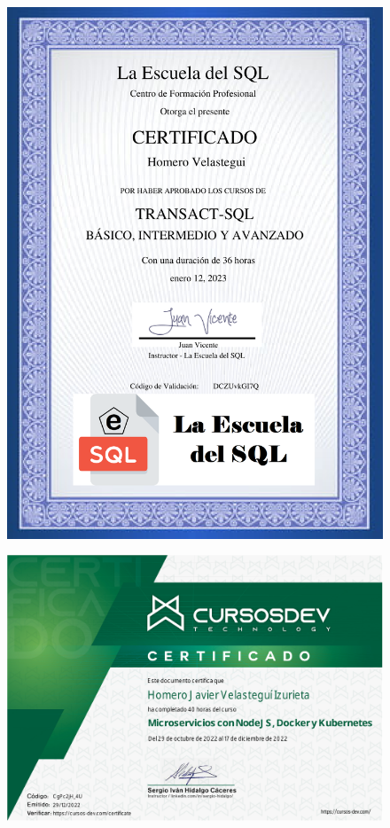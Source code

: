 \begin{figure}[ht]
    \setlength{\parindent}{-20pt}
    \includegraphics[width=\textwidth]{2.-Estudios/Certificados/9.pdf}
\end{figure}

\begin{figure}[ht]
    \setlength{\parindent}{-20pt}
    \includegraphics[width=\textwidth]{2.-Estudios/Certificados/8.pdf}
\end{figure}


